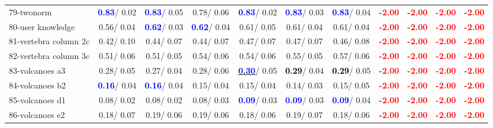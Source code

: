 \begin{table}[h]
\begin{center}
{\begin{tabular}{lc|c|c|c|c|c|c|c|c|c}
79-twonorm & \textcolor{blue}{\textbf{  0.83}}/  0.02 & \textcolor{blue}{\textbf{  0.83}}/  0.05 &   0.78/  0.06 & \textcolor{blue}{\textbf{  0.83}}/  0.02 & \textcolor{blue}{\textbf{  0.83}}/  0.03 & \textcolor{blue}{\textbf{  0.83}}/  0.04 & \textcolor{red}{\textbf{ -2.00}} & \textcolor{red}{\textbf{ -2.00}} & \textcolor{red}{\textbf{ -2.00}} & \textcolor{red}{\textbf{ -2.00}} \\
80-user knowledge &   0.56/  0.04 & \textcolor{blue}{\textbf{  0.62}}/  0.03 & \textcolor{blue}{\textbf{  0.62}}/  0.04 &   0.61/  0.05 &   0.61/  0.04 &   0.61/  0.04 & \textcolor{red}{\textbf{ -2.00}} & \textcolor{red}{\textbf{ -2.00}} & \textcolor{red}{\textbf{ -2.00}} & \textcolor{red}{\textbf{ -2.00}} \\
81-vertebra column 2c &   0.42/  0.10 &   0.44/  0.07 &   0.44/  0.07 &   0.47/  0.07 &   0.47/  0.07 &   0.46/  0.08 & \textcolor{red}{\textbf{ -2.00}} & \textcolor{red}{\textbf{ -2.00}} & \textcolor{red}{\textbf{ -2.00}} & \textcolor{red}{\textbf{ -2.00}} \\
82-vertebra column 3c &   0.51/  0.06 &   0.51/  0.05 &   0.54/  0.06 &   0.54/  0.06 &   0.55/  0.05 &   0.57/  0.06 & \textcolor{red}{\textbf{ -2.00}} & \textcolor{red}{\textbf{ -2.00}} & \textcolor{red}{\textbf{ -2.00}} & \textcolor{red}{\textbf{ -2.00}} \\
83-volcanoes a3 &   0.28/  0.05 &   0.27/  0.04 &   0.28/  0.06 & \underline{\textcolor{blue}{\textbf{  0.30}}}/  0.05 & \textcolor{black}{\textbf{  0.29}}/  0.04 & \textcolor{black}{\textbf{  0.29}}/  0.05 & \textcolor{red}{\textbf{ -2.00}} & \textcolor{red}{\textbf{ -2.00}} & \textcolor{red}{\textbf{ -2.00}} & \textcolor{red}{\textbf{ -2.00}} \\
84-volcanoes b2 & \textcolor{blue}{\textbf{  0.16}}/  0.04 & \textcolor{blue}{\textbf{  0.16}}/  0.04 &   0.15/  0.04 &   0.15/  0.04 &   0.14/  0.03 &   0.15/  0.05 & \textcolor{red}{\textbf{ -2.00}} & \textcolor{red}{\textbf{ -2.00}} & \textcolor{red}{\textbf{ -2.00}} & \textcolor{red}{\textbf{ -2.00}} \\
85-volcanoes d1 &   0.08/  0.02 &   0.08/  0.02 &   0.08/  0.03 & \textcolor{blue}{\textbf{  0.09}}/  0.03 & \textcolor{blue}{\textbf{  0.09}}/  0.03 & \textcolor{blue}{\textbf{  0.09}}/  0.04 & \textcolor{red}{\textbf{ -2.00}} & \textcolor{red}{\textbf{ -2.00}} & \textcolor{red}{\textbf{ -2.00}} & \textcolor{red}{\textbf{ -2.00}} \\ \hline
86-volcanoes e2 &   0.18/  0.07 &   0.19/  0.06 &   0.19/  0.06 &   0.18/  0.06 &   0.19/  0.07 &   0.18/  0.06 & \textcolor{red}{\textbf{ -2.00}} & \textcolor{red}{\textbf{ -2.00}} & \textcolor{red}{\textbf{ -2.00}} & \textcolor{red}{\textbf{ -2.00}} \\

\end{tabular}}
\end{center}
\end{table}
